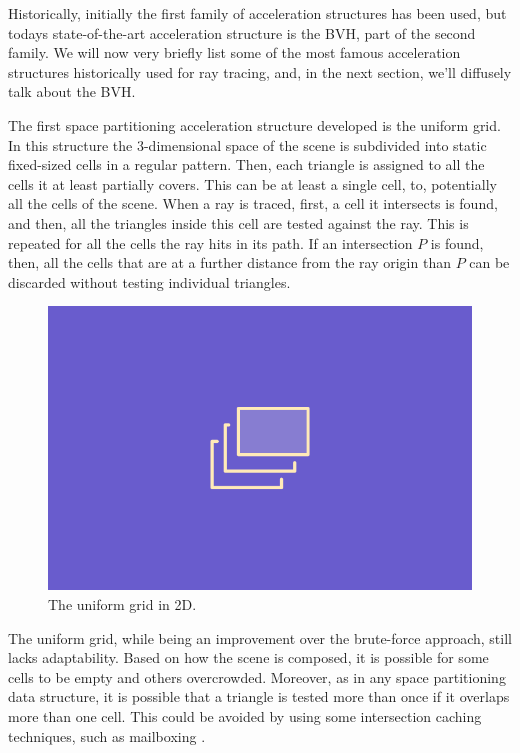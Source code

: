 \documentclass{PoliMi_MasterThesis}
\begin{document}
Historically, initially the first family of acceleration structures has been used, but todays state-of-the-art acceleration structure is the BVH, part of the second family. We will now very briefly list some of the most famous acceleration structures historically used for ray tracing, and, in the next section, we'll diffusely talk about the BVH.

The first space partitioning acceleration structure developed is the uniform grid. In this structure the 3-dimensional space of the scene is subdivided into static fixed-sized cells in a regular pattern. Then, each triangle is assigned to all the cells it at least partially covers. This can be at least a single cell, to, potentially all the cells of the scene. When a ray is traced, first, a cell it intersects is found, and then, all the triangles inside this cell are tested against the ray. This is repeated for all the cells the ray hits in its path. If an intersection $P$ is found, then, all the cells that are at a further distance from the ray origin than $P$ can be discarded without testing individual triangles.

\begin{figure}[H]
    \centering
    \includegraphics[width=\textwidth*\real{0.6}]{Images/TODO.png}
    \caption{The uniform grid in 2D.}
    \label{fig:uniform_grid}
\end{figure}

The uniform grid, while being an improvement over the brute-force approach, still lacks adaptability. Based on how the scene is composed, it is possible for some cells to be empty and others overcrowded. Moreover, as in any space partitioning data structure, it is possible that a triangle is tested more than once if it overlaps more than one cell. This could be avoided by using some intersection caching techniques, such as mailboxing \cite{mailboxing}.
\end{document}
